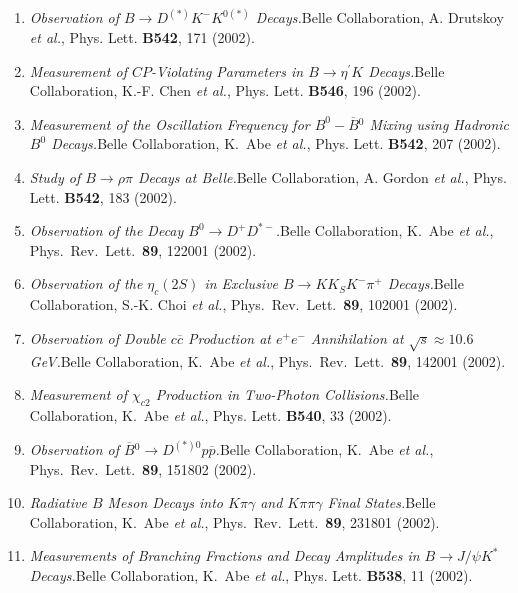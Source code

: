 \documentclass[10pt,a4paper]{article}
\def\pub#1#2#3{{\it #1.}\newline #2, #3.}
\def\cited#1{Cited $\ge$ #1}
\def\PLB#1{Phys. Lett. {\bf B#1}}
\def\PRL{Phys.\ Rev.\ Lett.\ }
\def\etal{{\it et al.}}
\def\belle{Belle Collaboration, K.~Abe \etal }
\begin{document}
\begin{enumerate}
\item
\pub{Observation of $B \to D^{(*)} K^- K^{0(*)}$ Decays}
{Belle Collaboration, A. Drutskoy \etal}
{\PLB{542}, 171 (2002)}

\item
\pub{Measurement of $CP$-Violating Parameters in $B \to \eta^\prime K$
Decays}
{Belle Collaboration, K.-F. Chen \etal}
{\PLB{546}, 196 (2002)}

\item
\pub{Measurement of the Oscillation Frequency for
 $B^0-\overline{B}{}^0$ Mixing using Hadronic $B^0$ Decays}
{\belle}
{\PLB{542}, 207 (2002)}

\item
\pub{Study of $B \to \rho \pi$ Decays at Belle}
{Belle Collaboration, A. Gordon \etal}
{\PLB{542}, 183 (2002)}

\item
\pub{Observation of the Decay $B^0 \to D^+ D^{*-}$}
{\belle}
{\PRL {\bf 89}, 122001 (2002)}

\item
\pub{Observation of the $\eta_c(2S)$ in Exclusive $B \to K K_S K^-
\pi^+$ Decays}
{Belle Collaboration, S.-K. Choi \etal}
{\PRL {\bf 89}, 102001 (2002)}

\item
\pub{Observation of Double $c \overline{c}$ Production at $e^+e^-$
Annihilation at $\sqrt{s} \approx 10.6$ GeV} 
{\belle}
{\PRL {\bf 89}, 142001 (2002)}

\item
\pub{Measurement of $\chi_{c2}$ Production in Two-Photon Collisions}
{\belle}
{\PLB{540}, 33 (2002)}

\item
\pub{Observation of $\overline{B}{}^0 \to D^{(*)0} p \overline{p}$}
{\belle}
{\PRL {\bf 89}, 151802 (2002)}

\item
\pub{Radiative $B$ Meson Decays into $K \pi \gamma$ and $K \pi \pi
\gamma$ Final States}
{\belle}
{\PRL {\bf 89}, 231801 (2002)}

\item
\pub{Measurements of Branching Fractions and Decay Amplitudes in $ B
\to J/\psi K^*$ Decays}
{\belle}
{\PLB{538}, 11 (2002)}


\end{enumerate}
\end{document}
